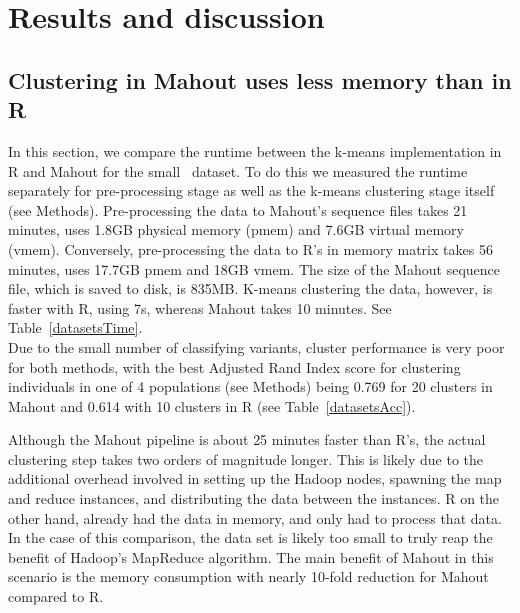 \documentclass{bioinfo}
\begin{document}


\section*{Results and discussion}

\subsection*{Clustering in Mahout uses less memory than in R}
In this section, we compare the runtime between the k-means implementation in R and Mahout for the small \OneReal\ dataset. 
To do this we measured the runtime separately for pre-processing stage as well as the k-means clustering stage itself (see Methods). 
Pre-processing the data to Mahout's sequence files takes 21 minutes, uses 1.8GB physical memory (pmem) and 7.6GB virtual memory (vmem).
Conversely,  pre-processing the data to R's in memory matrix takes 56 minutes, uses 17.7GB pmem and 18GB vmem. 
The size of the Mahout sequence file, which is saved to disk, is 835MB. 
K-means clustering the data, however, is faster with R, using 7s, whereas Mahout takes 10 minutes. See Table~\ref{datasetsTime}. \\
Due to the small number of classifying variants, cluster performance is very poor for both methods, with the best Adjusted Rand Index score for clustering individuals in one of 4 populations (see Methods) being 0.769 for 20 clusters in Mahout and 0.614 with 10 clusters in R (see Table~\ref{datasetsAcc}).

Although the Mahout pipeline is about 25 minutes faster than R's, the actual clustering step takes two orders of magnitude longer. 
This is likely due to the additional overhead involved in setting up the Hadoop nodes, spawning the map and reduce instances, and distributing the data between the instances. 
R on the other hand, already had the data in memory, and only had to process that data. 
In the case of this comparison, the data set is likely too small to truly reap the benefit of Hadoop's MapReduce algorithm. 
The main benefit of Mahout in this scenario is the memory consumption with nearly 10-fold reduction for Mahout compared to R. 


\end{document}
